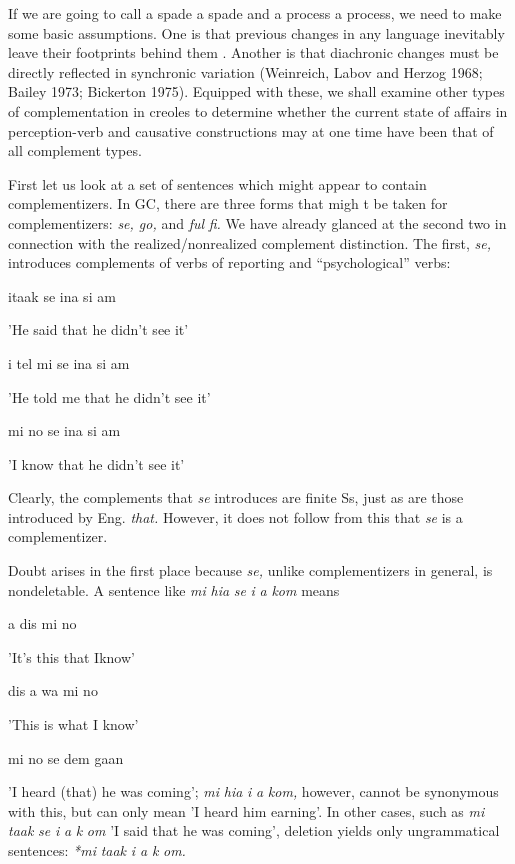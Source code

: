 If we are going to call a spade a spade and a process a process, we need to make some basic assumptions. One is that previous changes in any language inevitably leave their footprints behind them \citep{Givan1971}. Another is that diachronic changes must be directly reflected in synchronic variation (Weinreich, Labov and Herzog 1968; Bailey 1973; Bickerton 1975). Equipped with these, we shall examine other types of complementation in creoles to determine whether the current state of affairs in perception-verb and causative constructions may at one time have been that of all complement types.

First let us look at a set of sentences which might appear to contain complementizers. In GC, there are three forms that migh t be taken for complementizers: \textit{se, go,} and \textit{ful} \textit{fi.} We have already glanced at the second two in connection with the realized/nonrealized com\-plement distinction. The first, \textit{se,} introduces complements of verbs of reporting and ``psychological'' verbs:

\ea\label{ex:162}
 itaak se ina si am
\glt
\z

'He said that he didn't see it'

\ea\label{ex:163}
 i tel mi se ina si am
\glt
\z

'He told me that he didn't see it'

\ea\label{ex:164}
 mi no se ina si am
\glt
\z

'I know that he didn't see it'


Clearly, the complements that \textit{se} introduces are finite Ss, just as are those introduced by Eng. \textit{that.} However, it does not follow from this that \textit{se} is a complementizer.

Doubt arises in the first place because \textit{se,} unlike complementizers in general, is nondeletable. A sentence like \textit{mi} \textit{hia} \textit{se} \textit{i} \textit{a} \textit{kom} means

\ea\label{ex:170}
 a dis mi no
\glt
\z

'It's this that Iknow'

\ea\label{ex:171}
 dis a wa mi no
\glt
\z

'This is what I know'

\ea\label{ex:172}
 mi no se dem gaan
\glt
\z


'I heard (that) he was coming'; \textit{mi} \textit{hia} \textit{i} \textit{a} \textit{k}\textit{om,} however, cannot be synonymous with this, but can only mean 'I heard him earning'. In other cases, such as \textit{mi} \textit{taak} \textit{se} \textit{i} \textit{a} \textit{k} \textit{om} 'I said that he was coming', deletion yields only ungrammatical sentences: \textit{*mi} \textit{taak} \textit{i a} \textit{k} \textit{om.}

